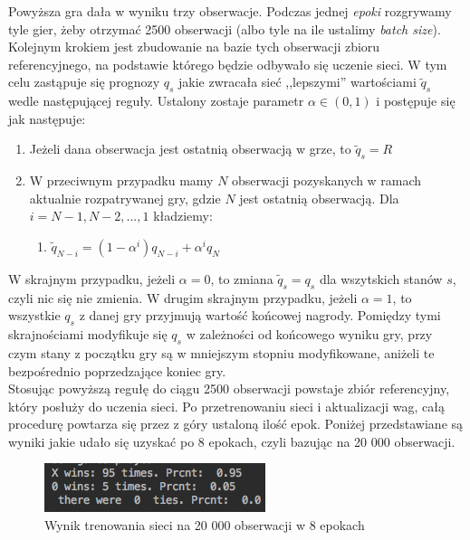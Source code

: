\documentclass[licencjacka]{pracamgr}
\begin{document}
Powyższa gra dała w wyniku trzy obserwacje. Podczas jednej \textit{epoki} rozgrywamy tyle gier, żeby otrzymać 2500 obserwacji (albo tyle na ile ustalimy \textit{batch size}). Kolejnym krokiem jest zbudowanie na bazie tych obserwacji zbioru referencyjnego, na podstawie którego będzie odbywało się uczenie sieci. W tym celu zastąpuje się prognozy $q_{s}$ jakie zwracała sieć ,,lepszymi'' wartościami $\tilde{q}_{s}$ wedle następującej reguły.  Ustalony zostaje parametr $\alpha\in(0,1)$ i postępuje się jak następuje:


\begin{enumerate}
	\item{Jeżeli dana obserwacja jest ostatnią obserwacją w grze, to $\tilde{q}_{s}= R$}
	\item{W przeciwnym przypadku mamy  $N$ obserwacji pozyskanych w ramach aktualnie rozpatrywanej gry, gdzie $N$ jest ostatnią obserwacją.  Dla $i=N-1, N-2,...,1$ kładziemy: }
	\begin{enumerate}
		\item{$\tilde{q}_{N-i}= (1-\alpha^{i})q_{N-i} + \alpha^{i}q_{N} $}
	\end{enumerate}
\end{enumerate}
W skrajnym przypadku, jeżeli $\alpha=0$, to zmiana $\tilde{q}_{s}=q_{s}$ dla wszytskich stanów $s$, czyli nic się nie zmienia. W drugim skrajnym przypadku, jeżeli $\alpha=1$, to wszystkie $q_{s}$ z danej gry przyjmują wartość końcowej nagrody. Pomiędzy tymi skrajnościami modyfikuje się $q_{s}$ w zależności od końcowego wyniku gry, przy czym stany z początku gry są w mniejszym stopniu modyfikowane, aniżeli te bezpośrednio poprzedzające koniec gry.  \\

Stosując powyższą regułę do ciągu 2500 obserwacji powstaje zbiór referencyjny, który posłuży do uczenia sieci. Po przetrenowaniu sieci i aktualizacji wag, całą procedurę powtarza się przez z góry ustaloną ilość epok. Poniżej przedstawiane są wyniki jakie udało się uzyskać po 8 epokach, czyli bazując na 20 000 obserwacji.\\

\begin{figure}[h!]
	\includegraphics [scale=0.7] {nn2_1.png}
	\caption{Wynik trenowania sieci na 20 000 obserwacji w 8 epokach}
	\label{Rys30}
\end{figure} 
\end{document}
